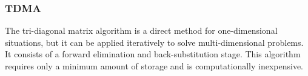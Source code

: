 \subsubsection{TDMA}
The tri-diagonal matrix algorithm is a direct method for one-dimensional situations, but it can be applied iteratively to solve multi-dimensional problems. It consists of a forward elimination and back-substitution stage. This algorithm requires only a minimum amount of storage and is computationally inexpensive. 
